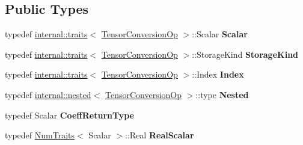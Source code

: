 \subsection*{Public Types}
\begin{DoxyCompactItemize}
\item 
\mbox{\label{class_eigen_1_1_tensor_conversion_op_ac871dd4b36d79e4f230180105c5efed4}} 
typedef \hyperlink{struct_eigen_1_1internal_1_1traits}{internal\+::traits}$<$ \hyperlink{class_eigen_1_1_tensor_conversion_op}{Tensor\+Conversion\+Op} $>$\+::Scalar {\bfseries Scalar}
\item 
\mbox{\label{class_eigen_1_1_tensor_conversion_op_a41fcb6a201998f6d1bbc9070445df9ff}} 
typedef \hyperlink{struct_eigen_1_1internal_1_1traits}{internal\+::traits}$<$ \hyperlink{class_eigen_1_1_tensor_conversion_op}{Tensor\+Conversion\+Op} $>$\+::Storage\+Kind {\bfseries Storage\+Kind}
\item 
\mbox{\label{class_eigen_1_1_tensor_conversion_op_ac7c68058d4475ca4b84ae9e8a3f376e0}} 
typedef \hyperlink{struct_eigen_1_1internal_1_1traits}{internal\+::traits}$<$ \hyperlink{class_eigen_1_1_tensor_conversion_op}{Tensor\+Conversion\+Op} $>$\+::Index {\bfseries Index}
\item 
\mbox{\label{class_eigen_1_1_tensor_conversion_op_af18f9121fee79ffa57fbe69befea605b}} 
typedef \hyperlink{struct_eigen_1_1internal_1_1nested}{internal\+::nested}$<$ \hyperlink{class_eigen_1_1_tensor_conversion_op}{Tensor\+Conversion\+Op} $>$\+::type {\bfseries Nested}
\item 
\mbox{\label{class_eigen_1_1_tensor_conversion_op_a82e8ed75416e8661a7106e064cb48196}} 
typedef Scalar {\bfseries Coeff\+Return\+Type}
\item 
\mbox{\label{class_eigen_1_1_tensor_conversion_op_a5d80c004750e3460cbbe41aeb4b86672}} 
typedef \hyperlink{group___core___module_struct_eigen_1_1_num_traits}{Num\+Traits}$<$ Scalar $>$\+::Real {\bfseries Real\+Scalar}
\item 
\mbox{\label{class_eigen_1_1_tensor_conversion_op_ac871dd4b36d79e4f230180105c5efed4}} 

\end{DoxyCompactItemize}
